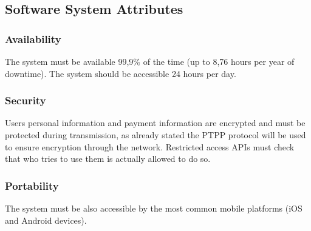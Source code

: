 \subsection{Software System Attributes}
	\subsubsection{Availability}
	The system must be available 99,9\% of the time (up to 8,76 hours per year of downtime). The system should be accessible 24 hours per day.
	\subsubsection{Security}
	Users personal information and payment information are encrypted and must be protected during transmission, as already stated the PTPP protocol will be used to ensure encryption through the network.
	Restricted access APIs must check that who tries to use them is actually allowed to do so.
	\subsubsection{Portability}
	The system must be also accessible by the most common mobile platforms (iOS and Android devices).

